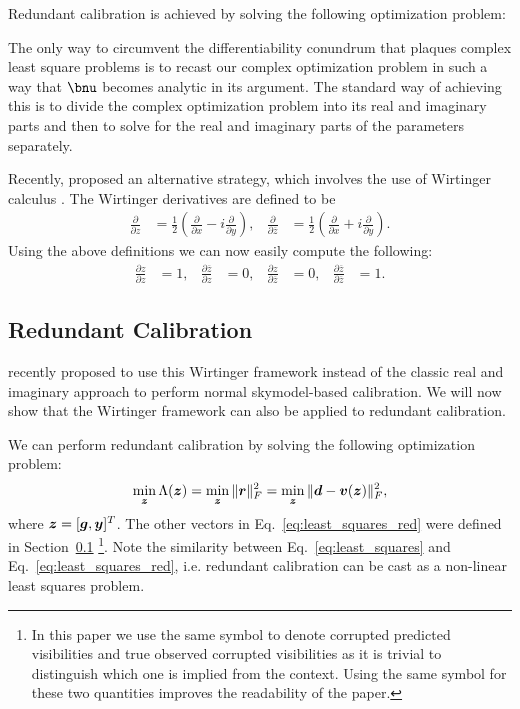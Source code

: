 \documentclass[useAMS,usenatbib]{mn2e}
\newcommand{\bz}{\bmath{z}}
\newcommand{\br}{\bmath{r}}
\newcommand{\bg}{\bmath{g}}
\newcommand{\bd}{\bmath{d}}
\newcommand{\bv}{\bmath{v}}
\newcommand{\by}{\bmath{y}}
\newcommand{\conj}[1]{\overline{#1}}
\begin{document}
Redundant calibration is achieved by solving the following optimization problem:

The only way to circumvent the differentiability conundrum that plaques complex least square problems is to recast our complex optimization problem in such a way that $\bnu$ becomes analytic in its argument.
The standard way of achieving this is to divide the complex optimization problem into its real and imaginary parts and then to solve for the real and imaginary parts of the parameters separately.

Recently, \citet{Sorber2012} proposed an alternative strategy, which involves the use of Wirtinger calculus \citep{Wirtinger1927}. The Wirtinger derivatives 
are defined to be 
\begin{align}
\label{eq:wir}
\frac{\partial}{\partial z} &= \frac{1}{2}\left ( \frac{\partial}{\partial x} -  i \frac{\partial}{\partial y} \right ),&\frac{\partial}{\partial \conj{z}} &= \frac{1}{2}\left ( \frac{\partial}{\partial x} +  i \frac{\partial}{\partial y} \right ). 
\end{align}
Using the above definitions we can now easily compute the following:
\begin{align}
\frac{\partial z}{\partial z} & = 1, & \frac{\partial \conj{z}}{\partial z}&=0, & \frac{\partial z}{\partial \conj{z}} & = 0, & \frac{\partial \conj{z}}{\partial \conj{z}}&=1.
\end{align}

\subsection{Redundant Calibration}
\citet{Smirnov2015} recently proposed to use this Wirtinger framework instead of the classic real and imaginary approach to perform normal skymodel-based calibration. We will now show
that the Wirtinger framework can also be applied to redundant calibration.

We can perform redundant calibration by solving the following optimization problem: 
\begin{equation}
\label{eq:least_squares_red}
\min_{\bz} \Lambda(\bz) = \min_{\bz} \|\br\|_F^2 = \min_{\bz} \|\bd - \bv(\bz)\|_F^2, 
\end{equation}
where $\bz = [\bg,\by]^T$. The other vectors in Eq.~\eqref{eq:least_squares_red} were defined in Section~\ref{} \footnote{In this paper we use the same symbol to denote corrupted predicted visibilities and true observed corrupted visibilities as it
is trivial to distinguish which one is implied from the context. Using the same symbol for these two quantities improves the readability of the paper.}. Note the similarity between Eq.~\eqref{eq:least_squares} and Eq.~\eqref{eq:least_squares_red},
i.e. redundant calibration can be cast as a non-linear least squares problem. 
\end{document}
